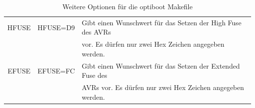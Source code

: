 \begin{table}[H]
\begin{center}
\begin{tabular}{| c | c | l |}
    \hline
    HFUSE          & HFUSE=D9       & Gibt einen Wunschwert für das Setzen der High Fuse des AVRs \\
                   &                & vor. Es dürfen nur zwei Hex Zeichen angegeben werden. \\
    \hline
    EFUSE          & EFUSE=FC       & Gibt einen Wunschwert für das Setzen der Extended Fuse des \\
                   &                & AVRs vor. Es dürfen nur zwei Hex Zeichen angegeben werden. \\
    \hline
    \end{tabular}
  \end{center}
  \caption{Weitere Optionen für die optiboot Makefile}
  \label{tab:options2}
\end{table}

